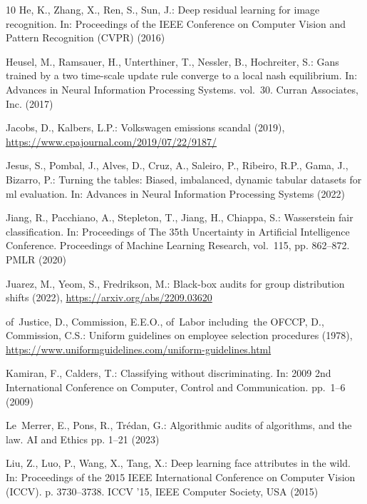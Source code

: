 \documentclass[runningheads, orivec]{llncs}
\begin{document}
\begin{thebibliography}{10}
He, K., Zhang, X., Ren, S., Sun, J.: Deep residual learning for image recognition. In: Proceedings of the IEEE Conference on Computer Vision and Pattern Recognition (CVPR) (2016)

Heusel, M., Ramsauer, H., Unterthiner, T., Nessler, B., Hochreiter, S.: Gans trained by a two time-scale update rule converge to a local nash equilibrium. In: Advances in Neural Information Processing Systems. vol.~30. Curran Associates, Inc. (2017)

Jacobs, D., Kalbers, L.P.: Volkswagen emissions scandal (2019), \url{https://www.cpajournal.com/2019/07/22/9187/}

Jesus, S., Pombal, J., Alves, D., Cruz, A., Saleiro, P., Ribeiro, R.P., Gama, J., Bizarro, P.: Turning the tables: Biased, imbalanced, dynamic tabular datasets for ml evaluation. In: Advances in Neural Information Processing Systems (2022)

Jiang, R., Pacchiano, A., Stepleton, T., Jiang, H., Chiappa, S.: Wasserstein fair classification. In: Proceedings of The 35th Uncertainty in Artificial Intelligence Conference. Proceedings of Machine Learning Research, vol.~115, pp. 862--872. PMLR (2020)

Juarez, M., Yeom, S., Fredrikson, M.: Black-box audits for group distribution shifts (2022), \url{https://arxiv.org/abs/2209.03620}

of~Justice, D., Commission, E.E.O., of~Labor including~the OFCCP, D., Commission, C.S.: Uniform guidelines on employee selection procedures (1978), \url{https://www.uniformguidelines.com/uniform-guidelines.html}

Kamiran, F., Calders, T.: Classifying without discriminating. In: 2009 2nd International Conference on Computer, Control and Communication. pp.~1--6 (2009)

Le~Merrer, E., Pons, R., Tr{\'e}dan, G.: {Algorithmic audits of algorithms, and the law}. {AI and Ethics} pp. 1--21 (2023)

Liu, Z., Luo, P., Wang, X., Tang, X.: Deep learning face attributes in the wild. In: Proceedings of the 2015 IEEE International Conference on Computer Vision (ICCV). p. 3730–3738. ICCV '15, IEEE Computer Society, USA (2015)


\end{thebibliography}
\end{document}
